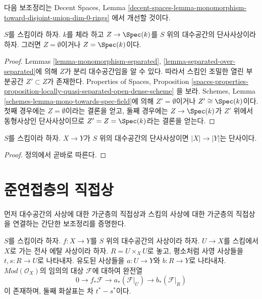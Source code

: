\noindent
다음 보조정리는 Decent Spaces, Lemma
\ref{decent-spaces-lemma-monomorphism-toward-disjoint-union-dim-0-rings}
에서 개선할 것이다.

\begin{lemma}
\label{lemma-monomorphism-toward-field}
$S$를 스킴이라 하자. $k$를 체라 하고
$Z \to \Spec(k)$를 $S$ 위의 대수공간의 단사사상이라 하자.
그러면 $Z = \emptyset$이거나 $Z = \Spec(k)$이다.
\end{lemma}

\begin{proof}
Lemmas \ref{lemma-monomorphism-separated},
\ref{lemma-separated-over-separated}에 의해 $Z$가 분리 대수공간임을
알 수 있다. 따라서 스킴인 조밀한 열린 부분공간 $Z' \subset Z$가
존재한다. Properties of Spaces, Proposition
\ref{spaces-properties-proposition-locally-quasi-separated-open-dense-scheme}
을 보라. Schemes, Lemma
\ref{schemes-lemma-mono-towards-spec-field}에 의해
$Z' = \emptyset$이거나 $Z' \cong \Spec(k)$이다.
첫째 경우에는 $Z = \emptyset$이라는 결론을 얻고, 둘째 경우에는
$Z \to \Spec(k)$가 $Z'$ 위에서 동형사상인 단사사상이므로
$Z' = Z = \Spec(k)$라는 결론을 얻는다.
\end{proof}

\begin{lemma}
\label{lemma-monomorphism-injective-points}
$S$를 스킴이라 하자. $X \to Y$가 $S$ 위의 대수공간의 단사사상이면
$|X| \to |Y|$는 단사이다.
\end{lemma}

\begin{proof}
정의에서 곧바로 따른다.
\end{proof}

\section{준연접층의 직접상}
\label{section-pushforward}

\noindent
먼저 대수공간의 사상에 대한 가군층의 직접상과 스킴의 사상에 대한
가군층의 직접상을 연결하는 간단한 보조정리를 증명한다.

\begin{lemma}
\label{lemma-compute-pushforward}
$S$를 스킴이라 하자.
$f : X \to Y$를 $S$ 위의 대수공간의 사상이라 하자.
$U \to X$를 스킴에서 $X$로 가는 전사 에탈 사상이라 하자.
$R = U \times_X U$로 놓고, 평소처럼 사영 사상들을
$t, s : R \to U$로 나타내자. 유도된 사상들을
$a : U \to Y$와 $b : R \to Y$로 나타내자.
$\textit{Mod}(\mathcal{O}_X)$의 임의의 대상 $\mathcal{F}$에 대하여
완전열
$$
0 \to f_*\mathcal{F} \to a_*(\mathcal{F}|_U) \to b_*(\mathcal{F}|_R)
$$
이 존재하며, 둘째 화살표는 차 $t^* - s^*$이다.
\end{lemma}

